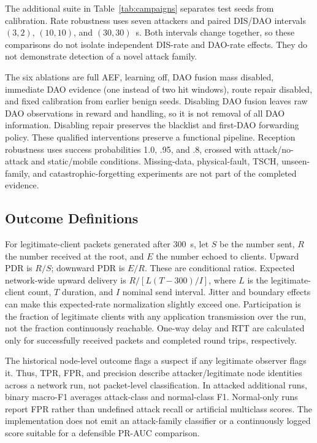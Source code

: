 The additional suite in Table~\ref{tab:campaigns} separates test seeds from calibration. Rate robustness uses seven attackers and paired DIS/DAO intervals $(3,2)$, $(10,10)$, and $(30,30)$~s. Both intervals change together, so these comparisons do not isolate independent DIS-rate and DAO-rate effects. They do not demonstrate detection of a novel attack family.

The six ablations are full AEF, learning off, DAO fusion mass disabled, immediate DAO evidence (one instead of two hit windows), route repair disabled, and fixed calibration from earlier benign seeds. Disabling DAO fusion leaves raw DAO observations in reward and handling, so it is not removal of all DAO information. Disabling repair preserves the blacklist and first-DAO forwarding policy. These qualified interventions preserve a functional pipeline. Reception robustness uses success probabilities 1.0, .95, and .8, crossed with attack/no-attack and static/mobile conditions. Missing-data, physical-fault, TSCH, unseen-family, and catastrophic-forgetting experiments are not part of the completed evidence.

\subsection{Outcome Definitions}
For legitimate-client packets generated after 300~s, let $S$ be the number sent, $R$ the number received at the root, and $E$ the number echoed to clients. Upward PDR is $R/S$; downward PDR is $E/R$. These are conditional ratios. Expected network-wide upward delivery is $R/[L(T-300)/I]$, where $L$ is the legitimate-client count, $T$ duration, and $I$ nominal send interval. Jitter and boundary effects can make this expected-rate normalization slightly exceed one. Participation is the fraction of legitimate clients with any application transmission over the run, not the fraction continuously reachable. One-way delay and RTT are calculated only for successfully received packets and completed round trips, respectively.

The historical node-level outcome flags a suspect if any legitimate observer flags it. Thus, TPR, FPR, and precision describe attacker/legitimate node identities across a network run, not packet-level classification. In attacked additional runs, binary macro-F1 averages attack-class and normal-class F1. Normal-only runs report FPR rather than undefined attack recall or artificial multiclass scores. The implementation does not emit an attack-family classifier or a continuously logged score suitable for a defensible PR-AUC comparison.

